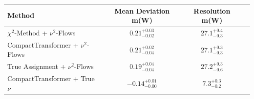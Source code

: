     \begin{tabular}{lccc}
        \toprule
        Method & Mean Deviation m(W) & Resolution m(W) \\
        \midrule
        $\chi^2$-Method + $\nu^2$-Flows & $0.21_{-0.02}^{+0.03}$ & $27.1_{-0.3}^{+0.4}$ \\
        CompactTransformer + $\nu^2$-Flows & $0.21_{-0.04}^{+0.02}$ & $27.1_{-0.3}^{+0.3}$ \\
        True Assignment + $\nu^2$-Flows & $0.19_{-0.04}^{+0.04}$ & $27.2_{-0.6}^{+0.3}$ \\
        CompactTransformer + True $\nu$ & $-0.14_{-0.00}^{+0.01}$ & $7.3_{-0.2}^{+0.3}$ \\
        \bottomrule
    \end{tabular}